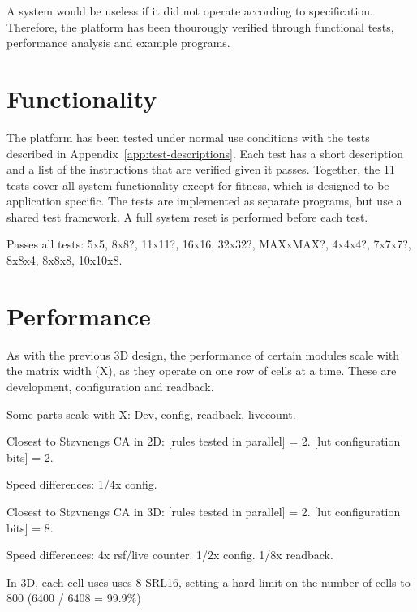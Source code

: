 A system would be useless if it did not operate according to specification.
Therefore, the platform has been thourougly verified through functional tests, performance analysis and example programs.

\section{Functionality}

The platform has been tested under normal use conditions with the tests described in Appendix~\ref{app:test-descriptions}.
Each test has a short description and a list of the instructions that are verified given it passes.
Together, the 11 tests cover all system functionality except for fitness, which is designed to be application specific.
The tests are implemented as separate programs, but use a shared test framework.
A full system reset is performed before each test.

Passes all tests: 5x5, 8x8?, 11x11?, 16x16, 32x32?, MAXxMAX?, 4x4x4?, 7x7x7?, 8x8x4, 8x8x8, 10x10x8.

\section{Performance}

As with the previous 3D design, the performance of certain modules scale with the matrix width (X), as they operate on one row of cells at a time.
These are development, configuration and readback.

\TODO

Some parts scale with X: Dev, config, readback, livecount.

Closest to Støvnengs CA in 2D:
[rules tested in parallel] = 2.
[lut configuration bits] = 2.

Speed differences:
1/4x config.

Closest to Støvnengs CA in 3D:
[rules tested in parallel] = 2.
[lut configuration bits] = 8.

Speed differences:
4x rsf/live counter.
1/2x config.
1/8x readback.

In 3D, each cell uses uses 8 SRL16, setting a hard limit on the number of cells to 800 (6400 / 6408 = 99.9\%)

